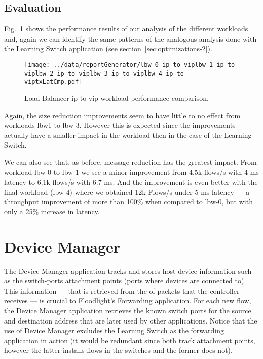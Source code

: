 \subsection{Evaluation}

Fig.~\ref{fig:lbw-ip-to-vip:comparison} shows the performance results of our analysis of the different workloads and, again we can identify the same patterns of the analogous analysis done with the  Learning Switch application (see section~\ref{sec:optimizations-2}). 

\begin{figure}[ht]
  \centering
\texttt{[image: ../data/reportGenerator/lbw-0-ip-to-viplbw-1-ip-to-viplbw-2-ip-to-viplbw-3-ip-to-viplbw-4-ip-to-viptxLatCmp.pdf]}
\caption[Load Balancer lbw-X-ip-to-vip comparison]{Load Balancer ip-to-vip workload performance comparison.}\label{fig:lbw-ip-to-vip:comparison}
\end{figure}


Again, the size reduction improvements seem to have little to no effect from workloads lbw1 to lbw-3. 
However this is expected since the improvements actually have a smaller impact in the workload then in the case of the Learning Switch. 

We can also see that, as before, message reduction has the greatest impact. 
From workload lbw-0 to lbw-1 we see a minor improvement from 4.5k flows/s with 4 ms latency to 6.1k flows/s with 6.7 ms.
And the improvement is even better with the final workload (lbw-4) where we obtained 12k Flows/s  under 5 ms latency --- 
a throughput improvement of more than 100\%  when compared to lbw-0, but with only a 25\% increase in latency. 


\section{Device Manager}
\label{sec:feasibility:dm}
\glsresetall

The Device Manager application tracks and stores host device information such as the switch-ports attachment points (ports where devices are connected to). 
This information --- that is retrieved from the \gls{of} packets that the controller receives --- is crucial to Floodlight’s Forwarding application. 
For each new flow, the Device Manager application retrieves the known switch ports for the source and destination address that are later used by other applications. 
Notice that the use of  Device Manager excludes the Learning Switch as the  forwarding application in action (it would be redundant since both track attachment points, however the latter installs flows in the switches and the former does not). 

